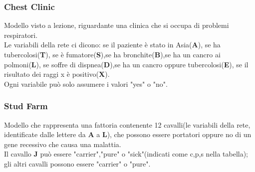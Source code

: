 \documentclass[a4paper]{article}
\begin{document}
\subsubsection{Chest Clinic}
Modello visto a lezione, riguardante una clinica che si occupa di problemi respiratori.\\
Le variabili della rete ci dicono: se il paziente è stato in Asia(\textbf{A}), se ha tubercolosi(\textbf{T}), se è fumatore(\textbf{S}),se ha bronchite(\textbf{B}),se ha un cancro ai polmoni(\textbf{L}), se soffre di dispnea(\textbf{D}),se ha un cancro oppure tubercolosi(\textbf{E}), se il risultato dei raggi x è positivo(\textbf{X}).\\
Ogni variabile può solo assumere i valori "yes" o "no".
\begin{table}[H]
\end{table}
\subsubsection{Stud Farm}
Modello che rappresenta una fattoria contenente 12 cavalli(le variabili della rete, identificate dalle lettere da \textbf{A} a \textbf{L}), che possono essere portatori oppure no di un gene recessivo che causa una malattia.\\
Il cavallo \textbf{J} può essere "carrier","pure" o "sick"(indicati come c,p,s nella tabella); gli altri cavalli possono essere "carrier" o "pure".
\begin{table}[H]
\end{table}
\end{document}
